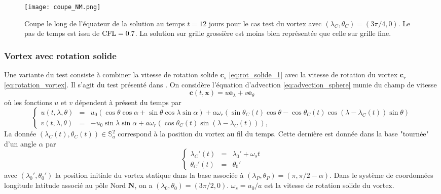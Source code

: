\begin{figure}[htbp]
\begin{center}
\texttt{[image: coupe\_NM.png]}
\end{center}
\caption{Coupe le long de l'équateur de la solution au temps $t=12$ jours pour le cas test du vortex \cite{Nair2002} avec $(\lambda_C, \theta_C) = (3 \pi / 4,0)$. Le pas de temps est issu de $\text{CFL} = 0.7$. La solution sur grille grossière est moins bien représentée que celle sur grille fine.}
\label{fig:coupe_NM}
\end{figure}









\subsubsection{Vortex avec rotation solide}

Une variante du test \cite{Nair2002} consiste à combiner la vitesse de rotation solide $\mathbf{c}_s$ \eqref{eq:rot_solide_1} avec la vitesse de rotation du vortex $\mathbf{c}_r$ \eqref{eq:rotation_vortex}. Il s'agit du test présenté dans \cite{Nair2008}.
On considère l'équation d'advection \eqref{eq:advection_sphere} munie du champ de vitesse
\begin{equation}
\mathbf{c}(t,\mathbf{x}) = u \mathbf{e}_{\lambda} + v \mathbf{e}_{\theta}
\end{equation}
où les fonctions $u$ et $v$ dépendent à présent du temps par 
\begin{equation}
\left\lbrace
\begin{array}{rcl}
u(t,\lambda, \theta) & = & u_0 \left( \cos \theta \cos \alpha + \sin \theta \cos \lambda \sin \alpha \right) + a \omega_r \left( \sin \theta_C(t) \cos \theta - \cos \theta_C(t) \cos (\lambda - \lambda_C(t)) \sin \theta \right) \\
v(t,\lambda, \theta) & = & - u_0 \sin \lambda \sin \alpha + a \omega_r \left( \cos \theta_C(t) \sin (\lambda - \lambda_C(t)) \right),
\end{array}
\right.
\label{eq:vitesse_NJ}
\end{equation}
La donnée $(\lambda_C(t), \theta_C(t)) \in \mathbb{S}_a^2$ correspond à la position du vortex au fil du temps. Cette dernière est donnée dans la base "tournée" d'un angle $\alpha$ par
\begin{equation}
\label{eq:vortexcenter1}
\left\lbrace
\begin{array}{rcl}
\lambda_C'(t) & = & \lambda_0' + \omega_s t \\
\theta_C'(t) & = & \theta_0'
\end{array}
\right.
\end{equation}
avec $(\lambda_0', \theta_0')$ la position initiale du vortex statique dans la base associée à $(\lambda_P, \theta_P)=(\pi, \pi/2-\alpha)$. Dans le système de coordonnées longitude latitude associé au pôle Nord $\mathbf{N}$, on a $(\lambda_0,\theta_0)=(3 \pi / 2, 0)$. $\omega_s = u_0/a$ est la vitesse de rotation solide du vortex. 

